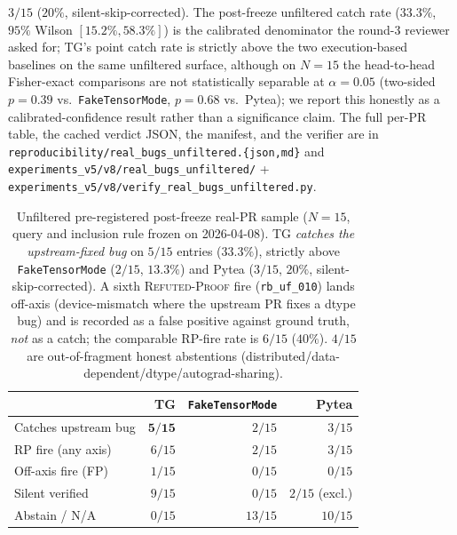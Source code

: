 $3/15$ ($20\%$, silent-skip-corrected).  The post-freeze unfiltered
catch rate ($33.3\%$, $95\%$ Wilson $[15.2\%, 58.3\%]$) is the
calibrated denominator the round-3 reviewer asked for; \textsc{TG}'s
point catch rate is strictly above the two execution-based baselines
on the same unfiltered surface, although on $N{=}15$ the head-to-head
Fisher-exact comparisons are not statistically separable at
$\alpha{=}0.05$ (two-sided $p{=}0.39$ vs.\ \texttt{FakeTensorMode},
$p{=}0.68$ vs.\ Pytea); we report this honestly as a
calibrated-confidence result rather than a significance claim.  The
full per-PR table, the cached verdict JSON, the manifest, and the
verifier are in
\texttt{reproducibility/real\_bugs\_unfiltered.\{json,md\}} and
\texttt{experiments\_v5/v8/real\_bugs\_unfiltered/} +
\texttt{experiments\_v5/v8/verify\_real\_bugs\_unfiltered.py}.

\begin{table}[t]
\centering\small\setlength{\tabcolsep}{4pt}
\caption{Unfiltered pre-registered post-freeze real-PR sample
($N{=}15$, query and inclusion rule frozen on 2026-04-08).
\textsc{TG} \emph{catches the upstream-fixed bug} on $5/15$
entries ($33.3\%$), strictly above \texttt{FakeTensorMode}
($2/15$, $13.3\%$) and Pytea
($3/15$, $20\%$, silent-skip-corrected).  A sixth
\textsc{Refuted-Proof} fire (\texttt{rb\_uf\_010}) lands
off-axis (device-mismatch where the upstream PR fixes a
dtype bug) and is recorded as a false positive against
ground truth, \emph{not} as a catch; the comparable
RP-fire rate is $6/15$ ($40\%$).  $4/15$ are out-of-fragment
honest abstentions (distributed/data-dependent/dtype/autograd-sharing).}
\label{tab:unfiltered-postfreeze}
\begin{tabular}{l rrr}
\toprule
                             & \textsc{TG}      & \texttt{FakeTensorMode} & Pytea            \\
\midrule
Catches upstream bug         & $\mathbf{5/15}$ & $2/15$                  & $3/15$           \\
RP fire (any axis)           & $6/15$           & $2/15$                  & $3/15$           \\
Off-axis fire (FP)           & $1/15$           & $0/15$                  & $0/15$           \\
Silent verified              & $9/15$           & $0/15$                  & $2/15$ (excl.)   \\
Abstain / N/A                & $0/15$           & $13/15$                 & $10/15$          \\
\bottomrule
\end{tabular}
\end{table}

